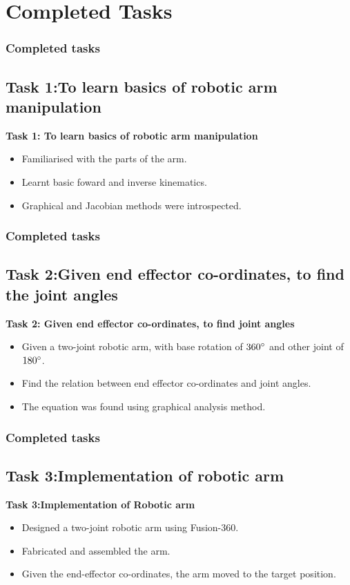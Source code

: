\documentclass{beamer}
\begin{document}
\section{Completed Tasks}
 \begin{frame}
 \frametitle{Completed tasks}
 \subsection{Task 1:To  learn basics of  robotic arm manipulation}
 \textbf{Task 1: To  learn basics of robotic arm manipulation}
 \begin{itemize}
 \item Familiarised with the parts of the arm.
 \item  Learnt basic foward and inverse kinematics.
 \item  Graphical and Jacobian methods were introspected.
 \end{itemize}

\end{frame}

\begin{frame}[fragile]
\frametitle{Completed tasks}
 \subsection{Task 2:Given end effector co-ordinates, to find the joint angles}
 \textbf{Task 2: Given end effector co-ordinates, to find joint angles}
 \begin{itemize}
 \item Given a two-joint robotic arm, with base rotation of $360\degree$ and other joint of $180\degree$.
 \item  Find the relation between end effector co-ordinates and joint angles.
 \item  The equation was found using graphical analysis method.
 \end{itemize}
\end{frame}

\begin{frame}[fragile]
\frametitle{Completed tasks}
\subsection{Task 3:Implementation of robotic arm}
\textbf{Task 3:Implementation of Robotic arm}
\begin{itemize}
\item Designed  a two-joint robotic arm using Fusion-360.
\item Fabricated and assembled the arm.
\item Given the end-effector co-ordinates, the arm moved to the target position.
\end{itemize}
\end{frame}
\end{document}
